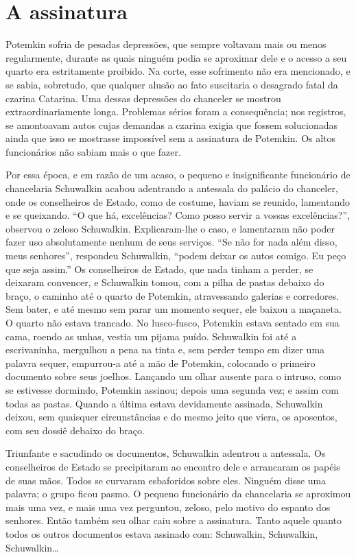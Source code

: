 \section{A assinatura }

Potemkin sofria de pesadas depressões, que sempre voltavam mais ou menos
regularmente, durante as quais ninguém podia se aproximar dele e o
acesso a seu quarto era estritamente proibido. Na corte, esse sofrimento
não era mencionado, e se sabia, sobretudo, que qualquer alusão ao fato
suscitaria o desagrado fatal da czarina Catarina. Uma dessas depressões
do chanceler se mostrou extraordinariamente longa. Problemas sérios
foram a consequência; nos registros, se amontoavam autos cujas demandas
a czarina exigia que fossem solucionadas ainda que isso se mostrasse
impossível sem a assinatura de Potemkin. Os altos funcionários não
sabiam mais o que fazer.

Por essa época, e em razão de um acaso, o pequeno e insignificante
funcionário de chancelaria Schuwalkin acabou adentrando a antessala do
palácio do chanceler, onde os conselheiros de Estado, como de costume,
haviam se reunido, lamentando e se queixando. ``O que há, excelências?
Como posso servir a vossas excelências?'', observou o zeloso Schuwalkin.
Explicaram-lhe o caso, e lamentaram não poder fazer uso absolutamente
nenhum de seus serviços. ``Se não for nada além disso, meus senhores'',
respondeu Schuwalkin, ``podem deixar os autos comigo. Eu peço que seja
assim.'' Os conselheiros de Estado, que nada tinham a perder, se
deixaram convencer, e Schuwalkin tomou, com a pilha de pastas debaixo do
braço, o caminho até o quarto de Potemkin, atravessando galerias e
corredores. Sem bater, e até mesmo sem parar um momento sequer, ele
baixou a maçaneta. O quarto não estava trancado. No lusco-fusco,
Potemkin estava sentado em sua cama, roendo as unhas, vestia um pijama
puído. Schuwalkin foi até a escrivaninha, mergulhou a pena na tinta e,
sem perder tempo em dizer uma palavra sequer, empurrou-a até a mão de
Potemkin, colocando o primeiro documento sobre seus joelhos. Lançando um
olhar ausente para o intruso, como se estivesse dormindo, Potemkin
assinou; depois uma segunda vez; e assim com todas as pastas. Quando a
última estava devidamente assinada, Schuwalkin deixou, sem quaisquer
circunstâncias e do mesmo jeito que viera, os aposentos, com seu dossiê
debaixo do braço.

Triunfante e sacudindo os documentos, Schuwalkin adentrou a antessala.
Os conselheiros de Estado se precipitaram ao encontro dele e arrancaram
os papéis de suas mãos. Todos se curvaram esbaforidos sobre eles.
Ninguém disse uma palavra; o grupo ficou pasmo. O pequeno funcionário da
chancelaria se aproximou mais uma vez, e mais uma vez perguntou, zeloso,
pelo motivo do espanto dos senhores. Então também seu olhar caiu sobre a
assinatura. Tanto aquele quanto todos os outros documentos estava
assinado com: Schuwalkin, Schuwalkin, Schuwalkin\ldots{}


